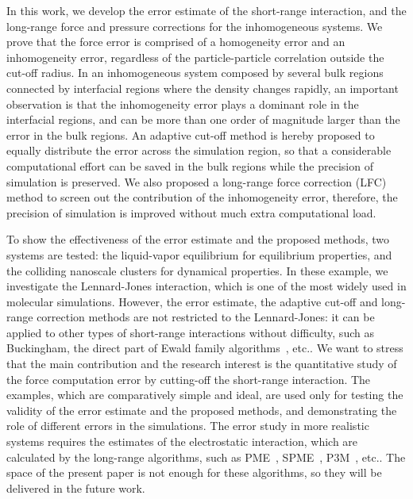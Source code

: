 \documentclass[aps, pre, preprint]{revtex4}
\begin{document}
In this work, we develop the error estimate of the short-range interaction,
and the long-range force and pressure corrections
for the inhomogeneous systems. We prove that the 
force error is comprised of a homogeneity error and an inhomogeneity
error, regardless of the particle-particle correlation outside the
cut-off radius.  In an inhomogeneous system composed by several bulk
regions connected by interfacial regions where the density changes
rapidly, an important observation is that the
inhomogeneity error plays a dominant role in the interfacial regions,
and can be more than one order of magnitude larger than
the error in the bulk regions. An
adaptive cut-off method is hereby proposed to equally distribute the
error across the simulation region, so that a considerable
computational effort can be saved in the bulk regions
while the precision of simulation is
preserved. We also proposed a long-range force correction (LFC) method
to screen out the contribution of the
inhomogeneity error, therefore,  the precision of
simulation is improved without much extra computational load.


To show the
effectiveness of the error estimate and the proposed methods, two
systems are tested: the liquid-vapor equilibrium for equilibrium
properties, and the colliding nanoscale clusters for dynamical
properties.{
  In these example, we investigate the Lennard-Jones interaction, which
  is one of the most widely used in molecular simulations.
  However, the error estimate,
  the adaptive cut-off and long-range correction methods
  are not restricted to the Lennard-Jones: it can
  be applied to other types of short-range interactions without 
  difficulty, such as
  Buckingham, the direct part of Ewald family algorithms~\cite{ewald1921die, darden1993pme, essmann1995spm, deserno1998mue1}, etc..
  We want to stress that the main contribution and the research interest is the
  quantitative study of the force computation error by cutting-off
  the short-range interaction.
  The examples, which are comparatively simple and ideal,
  are used only for testing the validity of the error
  estimate and the proposed methods,
  and demonstrating the role of different errors in the simulations.
  The error study in more realistic systems requires the
  estimates of the electrostatic interaction,
  which are calculated by the long-range algorithms, such as
  PME~\cite{darden1993pme}, SPME~\cite{essmann1995spm},
  P3M~\cite{deserno1998mue1}, etc..
  The space of the present paper is not enough for
  these algorithms, so they will be delivered in the future work.
}
\end{document}
